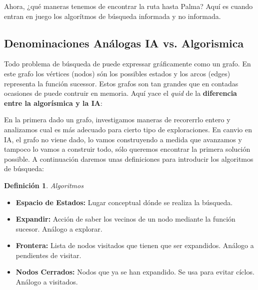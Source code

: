 \documentclass[12pt,a4paper,catalan, leqno]{article} %
\theoremstyle{definition}
\newtheorem{defn}{Definición}[section]
\begin{document}
\vspace{2mm}
\noindent{}
\vspace{1mm}

Ahora, ¿qué maneras tenemos de encontrar la ruta hasta Palma? Aquí es cuando entran en juego los algorítmos de búsqueda informada y no informada.

\subsection{Denominaciones Análogas IA vs. Algorismica}

Todo problema de búsqueda de puede expressar gráficamente como un grafo. En este grafo los vértices (nodos) són los possibles estados y los arcos (edges) representa la función sucessor. Estos grafos son tan grandes que en contadas ocasiones de puede contruir en memoria. Aquí yace el \textit{quid} de la \textbf{diferencia entre la algorísmica y la IA}:

En la primera dado un grafo, investigamos maneras de recorerrlo entero y analizamos cual es más adecuado para cierto tipo de exploraciones. En canvio en IA, el grafo no viene dado, lo vamos construyendo a medida que avanzamos y tampoco lo vamos a construir todo, sólo queremos encontrar la primera solución possible. A continuación daremos unas definiciones para introducir los algoritmos de búsqueda:

\begin{defn}\textit{Algoritmos}
\begin{itemize}
    \item \textbf{Espacio de Estados:} Lugar conceptual dónde se realiza la búsqueda.
    \item \textbf{Expandir:} Acción de saber los vecinos de un nodo mediante la función sucesor. Análogo a explorar.
    \item \textbf{Frontera:} Lista de nodos visitados que tienen que ser expandidos. Análogo a pendientes de visitar.
    \item \textbf{Nodos Cerrados:} Nodos que ya se han expandido. Se usa para evitar cíclos. Análogo a visitados.
\end{itemize}
\end{defn}
\end{document}
